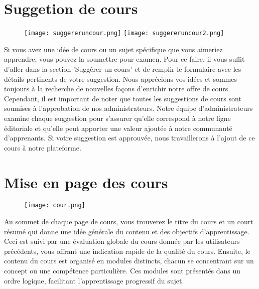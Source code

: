 \documentclass{article}
\begin{document}
\section{Suggetion de cours}
\begin{figure}[h]
\centering
\texttt{[image: suggereruncour.png]} 
\texttt{[image: suggereruncour2.png]} 
\end{figure}
Si vous avez une idée de cours ou un sujet spécifique que vous aimeriez apprendre, vous pouvez la soumettre pour examen. Pour ce faire, il vous suffit d'aller dans la section 'Suggérer un cours' et de remplir le formulaire avec les détails pertinents de votre suggestion. Nous apprécions vos idées et sommes toujours à la recherche de nouvelles façons d'enrichir notre offre de cours.
Cependant, il est important de noter que toutes les suggestions de cours sont soumises à l'approbation de nos administrateurs. Notre équipe d'administrateurs examine chaque suggestion pour s'assurer qu'elle correspond à notre ligne éditoriale et qu'elle peut apporter une valeur ajoutée à notre communauté d'apprenants. Si votre suggestion est approuvée, nous travaillerons à l'ajout de ce cours à notre plateforme.

\newpage




\section{Mise en page des cours}
\begin{figure}[h]
\centering
\texttt{[image: cour.png]} 
\end{figure}
Au sommet de chaque page de cours, vous trouverez le titre du cours et un court résumé qui donne une idée générale du contenu et des objectifs d'apprentissage. Ceci est suivi par une évaluation globale du cours donnée par les utilisateurs précédents, vous offrant une indication rapide de la qualité du cours.
Ensuite, le contenu du cours est organisé en modules distincts, chacun se concentrant sur un concept ou une compétence particulière. Ces modules sont présentés dans un ordre logique, facilitant l'apprentissage progressif du sujet.
\end{document}
